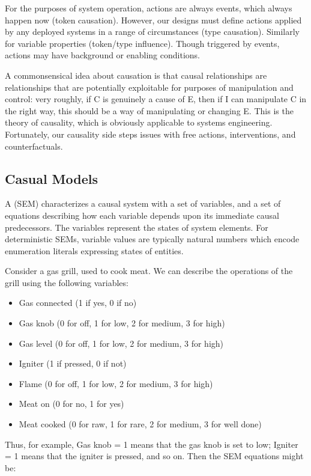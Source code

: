 \pn For the purposes of system operation, actions are always events, which always happen now (token causation).  However, our designs must define actions applied by any deployed systems in a range of circumstances (type causation).  Similarly for variable properties (token/type influence).  Though triggered by events, actions may have background or enabling conditions.

\pn A commonsensical idea about causation is that causal relationships are relationships that are potentially exploitable for purposes of manipulation and control: very roughly, if C
 is genuinely a cause of E, then if I can manipulate C in the right way, this should be a way of manipulating or changing E. \cite{sep-causation-mani}  This is the  theory of causality, which is obviously applicable to systems engineering.
 Fortunately, our causality side steps issues with free actions, interventions, and counterfactuals.
 
 \subsection{Casual Models}\label{sec:causalmodels}
 

\pn A  (SEM) characterizes a causal system with a set of variables, and a set of equations describing how each variable depends upon its immediate causal predecessors.\cite{sep-causal-models}  The variables represent the states of system elements.  For deterministic SEMs, variable values are typically natural numbers which encode enumeration literals expressing states of entities.

\pn Consider a gas grill, used to cook meat. We can describe the operations of the grill using the following variables:
\begin{itemize}
\item Gas connected (1 if yes, 0 if no)
\item Gas knob (0 for off, 1 for low, 2 for medium, 3 for high)
\item Gas level (0 for off, 1 for low, 2 for medium, 3 for high)
\item Igniter (1 if pressed, 0 if not)
\item Flame (0 for off, 1 for low, 2 for medium, 3 for high)
\item Meat on (0 for no, 1 for yes)
\item Meat cooked (0 for raw, 1 for rare, 2 for medium, 3 for well done)
\end{itemize}
Thus, for example, Gas knob = 1 means that the gas knob is set to low; Igniter = 1 means that the igniter is pressed, and so on. Then the SEM equations might be:

